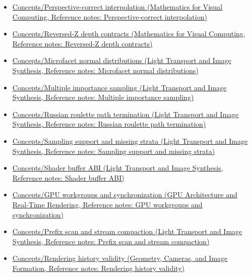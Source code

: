 \begin{itemize}
\tightlist
\item
  \href{../02-Mathematics-for-Visual-Computing/main.pdf\#nameddest=appendix-1ed5f96c73ea}{Concepts/Perspective-correct interpolation (Mathematics for Visual Computing, Reference notes: Perspective-correct interpolation)}
\item
  \href{../02-Mathematics-for-Visual-Computing/main.pdf\#nameddest=appendix-275ec8847057}{Concepts/Reversed-Z depth contracts (Mathematics for Visual Computing, Reference notes: Reversed-Z depth contracts)}
\item
  \href{../04-Light-Transport-and-Image-Synthesis/main.pdf\#nameddest=appendix-885c1cb64ae9}{Concepts/Microfacet normal distributions (Light Transport and Image Synthesis, Reference notes: Microfacet normal distributions)}
\item
  \href{../04-Light-Transport-and-Image-Synthesis/main.pdf\#nameddest=appendix-ca8898faf1a6}{Concepts/Multiple importance sampling (Light Transport and Image Synthesis, Reference notes: Multiple importance sampling)}
\item
  \href{../04-Light-Transport-and-Image-Synthesis/main.pdf\#nameddest=appendix-7277c62d4599}{Concepts/Russian roulette path termination (Light Transport and Image Synthesis, Reference notes: Russian roulette path termination)}
\item
  \href{../04-Light-Transport-and-Image-Synthesis/main.pdf\#nameddest=appendix-10308c3d753e}{Concepts/Sampling support and missing strata (Light Transport and Image Synthesis, Reference notes: Sampling support and missing strata)}
\item
  \href{../04-Light-Transport-and-Image-Synthesis/main.pdf\#nameddest=appendix-749048795dbb}{Concepts/Shader buffer ABI (Light Transport and Image Synthesis, Reference notes: Shader buffer ABI)}
\item
  \href{../06-GPU-Architecture-and-Real-Time-Rendering/main.pdf\#nameddest=appendix-f662b5b1773b}{Concepts/GPU workgroups and synchronization (GPU Architecture and Real-Time Rendering, Reference notes: GPU workgroups and synchronization)}
\item
  \href{../04-Light-Transport-and-Image-Synthesis/main.pdf\#nameddest=appendix-f2ee4d086415}{Concepts/Prefix scan and stream compaction (Light Transport and Image Synthesis, Reference notes: Prefix scan and stream compaction)}
\item
  \href{../03-Geometry-Cameras-and-Image-Formation/main.pdf\#nameddest=appendix-2e7e9fd28a2c}{Concepts/Rendering history validity (Geometry, Cameras, and Image Formation, Reference notes: Rendering history validity)}
\end{itemize}

